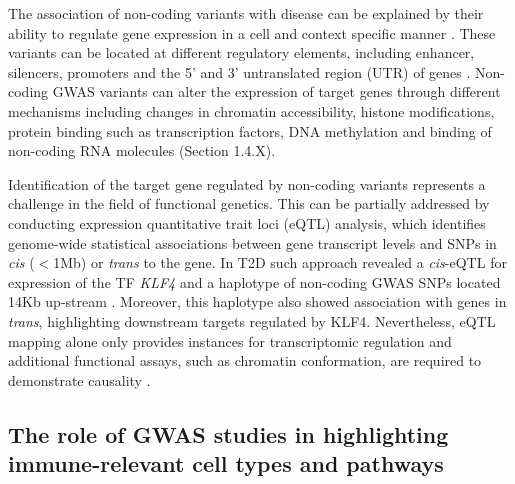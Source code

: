 The association of non-coding variants with disease can be explained by their ability to regulate gene expression in a cell and context specific manner \parencite{Fairfax2012}. These variants can be located at different regulatory elements, including enhancer, silencers, promoters and the 5' and 3' untranslated region (UTR) of genes \parencite{Ward2012}. Non-coding GWAS variants can alter the expression of target genes through different mechanisms including changes in chromatin accessibility, histone modifications, protein binding such as transcription factors, DNA methylation and binding of non-coding  RNA molecules\parencite{Knight2014} (Section 1.4.X).

Identification of the target gene regulated by non-coding variants represents a challenge in the field of functional genetics. This can be partially addressed by conducting expression quantitative trait loci (eQTL) analysis, which identifies genome-wide statistical associations between gene transcript levels and SNPs in \textit{cis} ($<$1Mb) or \textit{trans} to the gene. In T2D such approach revealed a \textit{cis}-eQTL for expression of the TF \textit{KLF4} and a haplotype of non-coding GWAS SNPs located 14Kb up-stream \parencite{Small2011}. Moreover, this haplotype also showed association with genes in \textit{trans}, highlighting downstream targets regulated by KLF4. Nevertheless, eQTL mapping alone only provides instances for transcriptomic regulation and additional functional assays, such as chromatin conformation, are required to demonstrate causality \parencite{Edwards2013}.  


\subsection{The role of GWAS studies in highlighting immune-relevant cell types and pathways}

